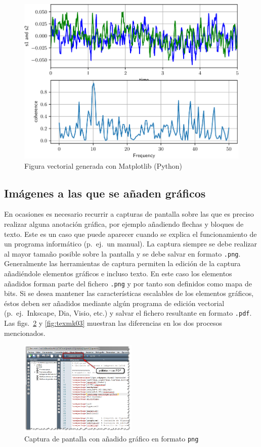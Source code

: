 \documentclass[11pt,a4paper]{article}
\begin{document}
\begin{figure}[htb]
	\centering
	\includegraphics[width=0.8\linewidth]{fig2_py}
	\caption[Figura hecha desde Python]{Figura vectorial generada con Matplotlib (Python)}
	\label{fig:python}
\end{figure}


\subsection{Imágenes a las que se añaden gráficos}
En ocasiones es necesario recurrir a capturas de pantalla sobre las que es preciso realizar alguna anotación gráfica, por ejemplo añadiendo flechas y bloques de texto. Este es un caso que puede aparecer cuando se explica el funcionamiento de un programa informático (p.~ej.\ un manual). La captura siempre se debe realizar al mayor tamaño posible sobre la pantalla y se debe salvar en formato \texttt{.png}. Generalmente las herramientas de captura permiten la edición de la captura añadiéndole elementos gráficos e incluso texto. En este caso los elementos añadidos 
forman parte del fichero \texttt{.png} y por tanto son definidos como mapa de bits. Si se desea mantener las características escalables de los elementos gráficos, éstos deben ser añadidos mediante algún programa de edición vectorial (p.~ej.\ 
\textsf{Inkscape}, \textsf{Dia}, \textsf{Visio}, etc.) y salvar el fichero resultante en formato \texttt{.pdf}. Las figs.~\ref{fig:texmk02} y \ref{fig:texmk03} muestran las diferencias en los dos procesos mencionados.

\begin{figure}[htb]
	\centering
	\includegraphics[width=0.5\textwidth]{texmk02} 
	\caption[Captura con gráfico en \texttt{png}]{Captura de pantalla con añadido gráfico en formato \texttt{png}}
	\label{fig:texmk02}
\end{figure}
\end{document}
